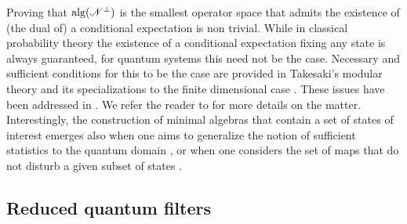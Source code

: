 \documentclass[aihp,12pt]{imsart}
\begin{document}
\begin{remark}
    Proving that ${\rm alg}(\mathscr{N}^\perp)$ is the smallest operator space that admits the existence of (the dual of) a conditional expectation is non trivial. While in classical probability theory the existence of a conditional expectation fixing any state is always guaranteed, for quantum systems this need not be the case. Necessary and sufficient conditions for this to be the case are provided in Takesaki's modular theory and its specializations to the finite dimensional case \cite{TAKESAKI1972306,petz2007quantum,tit2023}. These issues have been addressed in \cite[Theorem 4]{tit2023}. We refer the reader to \cite[Sections IV and V]{tit2023} for more details on the matter. Interestingly, the construction of minimal algebras that contain a set of states of interest emerges also when one aims to generalize the notion of sufficient statistics to the quantum domain \cite{jenvcova2006sufficiency}, or when one considers the set of maps that do not disturb a given subset of states \cite{PhysRevA.66.022318}.
\end{remark}

\subsection{Reduced quantum filters}
\end{document}
